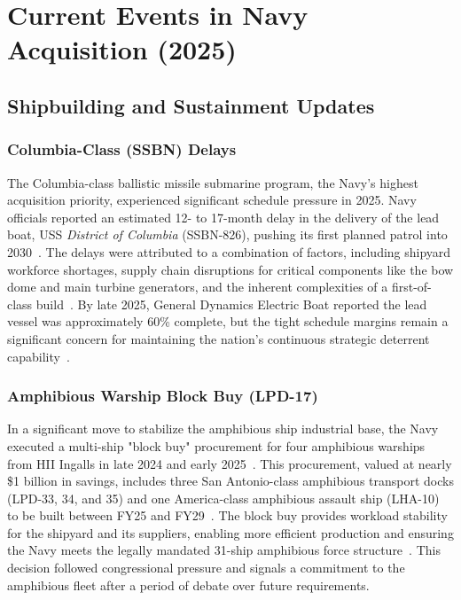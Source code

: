 \documentclass[../main.tex]{subfiles}
\begin{document}

\chapter{Current Events in Navy Acquisition (2025)}\label{ch:current-events}


\section{Shipbuilding and Sustainment Updates}

\subsection{Columbia-Class (SSBN) Delays}
The Columbia-class ballistic missile submarine program, the Navy's highest acquisition priority, experienced significant schedule pressure in 2025. Navy officials reported an estimated 12- to 17-month delay in the delivery of the lead boat, USS \textit{District of Columbia} (SSBN-826), pushing its first planned patrol into 2030~\autocite{crs-columbia-2025}. The delays were attributed to a combination of factors, including shipyard workforce shortages, supply chain disruptions for critical components like the bow dome and main turbine generators, and the inherent complexities of a first-of-class build~\autocite{crs-columbia-2025,defensenews-columbia-2025}. By late 2025, General Dynamics Electric Boat reported the lead vessel was approximately 60\% complete, but the tight schedule margins remain a significant concern for maintaining the nation's continuous strategic deterrent capability~\autocite{usni-columbia-2025}.

\subsection{Amphibious Warship Block Buy (LPD-17)}
In a significant move to stabilize the amphibious ship industrial base, the Navy executed a multi-ship "block buy" procurement for four amphibious warships from HII Ingalls in late 2024 and early 2025~\autocite{breakingdefense-amphib-2024}. This procurement, valued at nearly \$1 billion in savings, includes three San Antonio-class amphibious transport docks (LPD-33, 34, and 35) and one America-class amphibious assault ship (LHA-10) to be built between FY25 and FY29~\autocite{breakingdefense-amphib-2024}. The block buy provides workload stability for the shipyard and its suppliers, enabling more efficient production and ensuring the Navy meets the legally mandated 31-ship amphibious force structure~\autocite{gao-amphib-2024}. This decision followed congressional pressure and signals a commitment to the amphibious fleet after a period of debate over future requirements.
\end{document}
